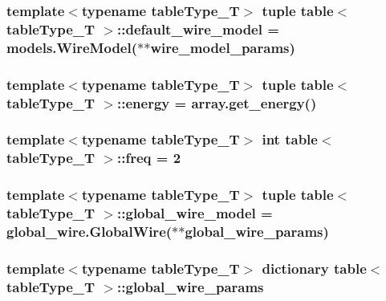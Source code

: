 \label{classtable_a252e7ab94c46dafbdab734b5ceedc267}
\hypertarget{classtable_aa789a61b22c94a65f51a3505311b03fc}{
\subsubsection[{default\_\-wire\_\-model}]{\setlength{\rightskip}{0pt plus 5cm}template$<$typename tableType\_\-T$>$ tuple {\bf table}$<$ tableType\_\-T $>$::{\bf default\_\-wire\_\-model} = {\bf models.WireModel}($\ast$$\ast${\bf wire\_\-model\_\-params})}}
\label{classtable_aa789a61b22c94a65f51a3505311b03fc}
\hypertarget{classtable_a1e6eebfecef9fda79cddfa1d45c2e8fa}{
\subsubsection[{energy}]{\setlength{\rightskip}{0pt plus 5cm}template$<$typename tableType\_\-T$>$ tuple {\bf table}$<$ tableType\_\-T $>$::{\bf energy} = array.get\_\-energy()}}
\label{classtable_a1e6eebfecef9fda79cddfa1d45c2e8fa}
\hypertarget{classtable_a794bcbed0154faed6ad430ef6e563ace}{
\subsubsection[{freq}]{\setlength{\rightskip}{0pt plus 5cm}template$<$typename tableType\_\-T$>$ int {\bf table}$<$ tableType\_\-T $>$::{\bf freq} = 2}}
\label{classtable_a794bcbed0154faed6ad430ef6e563ace}
\hypertarget{classtable_a2c6d189f908ac28d316ae1afa2a18324}{
\subsubsection[{global\_\-wire\_\-model}]{\setlength{\rightskip}{0pt plus 5cm}template$<$typename tableType\_\-T$>$ tuple {\bf table}$<$ tableType\_\-T $>$::{\bf global\_\-wire\_\-model} = {\bf global\_\-wire.GlobalWire}($\ast$$\ast${\bf global\_\-wire\_\-params})}}
\label{classtable_a2c6d189f908ac28d316ae1afa2a18324}
\hypertarget{classtable_afa4455260ca054710631a16d93ad1848}{
\subsubsection[{global\_\-wire\_\-params}]{\setlength{\rightskip}{0pt plus 5cm}template$<$typename tableType\_\-T$>$ dictionary {\bf table}$<$ tableType\_\-T $>$::{\bf global\_\-wire\_\-params}}}
